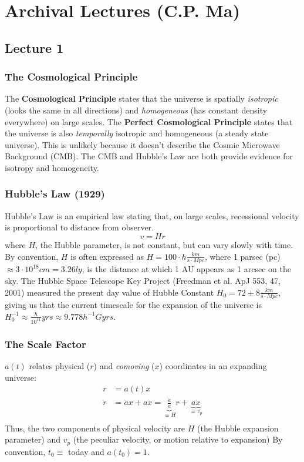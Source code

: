 \documentclass{article}
\def\aa{\frac{\dot a }{ a}}
\begin{document}
\appendix 

\section{Archival Lectures (C.P. Ma)}

\subsection{Lecture 1}

\subsubsection{ The Cosmological Principle}

The {\bf Cosmological Principle} states that the universe is spatially 
{\it isotropic} (looks the same in all directions) 
and {\it homogeneous} (has constant density everywhere) on large scales.
The {\bf Perfect Cosmological Principle} states that the universe is
also {\it temporally} isotropic and homogeneous (a steady state universe). 
This is unlikely because it doesn't describe the Cosmic Microwave Background
(CMB).  The CMB and Hubble's Law are both provide evidence for isotropy and
homogeneity.

\subsubsection{ Hubble's Law (1929) }

Hubble's Law is an empirical law stating that, on large scales, recessional 
velocity is proportional to distance from observer.
$$\boxed{v=Hr}$$ 
where $H$, the Hubble parameter, is not constant, but can
vary slowly with time.  By convention, $H$ is often expressed as
$H=100\cdot h\frac{km}{ s\cdot Mpc}$, where 1 parsec (pc) $\approx3\cdot10^{18}cm
=3.26ly$, is the distance at which 1 AU appears as 1 arcsec on the sky.  
The Hubble Space Telescope Key Project (Freedman et al. ApJ 553, 47, 2001)
measured the present day value of Hubble Constant 
$H_0=72\pm 8\frac{km}{ s\cdot Mpc}$, giving us that the current timescale for
the expansion of the universe is 
$H_0^{-1}\approx\frac{h}{ 10^{11}}yrs\approx 9.778h^{-1}Gyrs$.

\subsubsection{ The Scale Factor }

$a(t)$ relates physical ($r$) and {\it comoving} ($x$) coordinates in an
expanding universe:
\begin{align}
r&=a(t)x\\
\dot r&=\dot ax+a\dot x=\underbrace{\aa}_{\equiv H}r+\underbrace{a\dot x}_{\equiv v_p}\\
\end{align}
Thus, the two components of physical velocity are $H$ (the Hubble expansion 
parameter) and $v_p$ (the peculiar velocity, or motion relative to expansion)
By convention, $t_0 \equiv$ today and $a(t_0)=1$.
\end{document}
